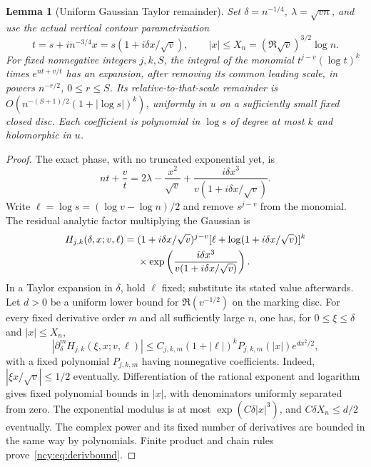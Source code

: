 \documentclass[11pt,letterpaper]{article}
\numberwithin{equation}{section}
\newtheorem{lemma}[theorem]{Lemma}
\theoremstyle{remark}\newtheorem{remark}[theorem]{Remark}
\theoremstyle{definition}\newtheorem{definition}[theorem]{Definition}\theoremstyle{plain}
\begin{document}
\begin{lemma}[Uniform Gaussian Taylor remainder]\label{ncy:lem:gaussian}
Set $\delta=n^{-1/4}$, $\lambda=\sqrt{vn}$, and use the actual
vertical contour parametrization
\[
 t=s+in^{-3/4}x=s(1+i\delta x/\sqrt v),\qquad
 |x|\leq X_n=(\Re\sqrt v)^{3/2}\log n.
\]
For fixed nonnegative integers $j,k,S$, the integral of the monomial
$t^{j-v}(\log t)^k$ times $e^{nt+v/t}$ has an expansion, after removing
its common leading scale, in powers $n^{-r/2}$, $0\leq r\leq S$.
Its relative-to-that-scale remainder is
$O(n^{-(S+1)/2}(1+|\log s|)^k)$, uniformly in $u$ on a sufficiently
small fixed closed disc. Each coefficient is polynomial in $\log s$
of degree at most $k$ and holomorphic in $u$.
\end{lemma}
\begin{proof}
The exact phase, with no truncated exponential yet, is
\begin{equation}\label{ncy:eq:exactphase}
 nt+\frac vt=2\lambda-\frac{x^2}{\sqrt v}
             +\frac{i\delta x^3}{v(1+i\delta x/\sqrt v)}.
\end{equation}
Write $\ell=\log s=(\log v-\log n)/2$ and remove $s^{j-v}$ from the
monomial. The residual analytic factor multiplying the Gaussian is
\begin{align}\label{ncy:eq:H}
 H_{j,k}(\delta,x;v,\ell)={}&(1+i\delta x/\sqrt v)^{j-v}
       [\ell+\log(1+i\delta x/\sqrt v)]^k\notag\\
 &\times\exp\left(\frac{i\delta x^3}{v(1+i\delta x/\sqrt v)}\right).
\end{align}
In a Taylor expansion in $\delta$, hold $\ell$ fixed; substitute its
stated value afterwards. Let $d>0$ be a uniform lower bound for
$\Re(v^{-1/2})$ on the marking disc. For every fixed derivative order
$m$ and all sufficiently large $n$, one has, for $0\leq\xi\leq\delta$
and $|x|\leq X_n$,
\begin{equation}\label{ncy:eq:derivbound}
 |\partial_\delta^mH_{j,k}(\xi,x;v,\ell)|
 \leq C_{j,k,m}(1+|\ell|)^k
            P_{j,k,m}(|x|)e^{dx^2/2},
\end{equation}
with a fixed polynomial $P_{j,k,m}$ having nonnegative coefficients.
Indeed, $|\xi x/\sqrt v|\leq1/2$ eventually. Differentiation of the
rational exponent and logarithm gives fixed polynomial bounds in
$|x|$, with denominators uniformly separated from zero. The exponential
modulus is at most $\exp(C\delta |x|^3)$, and
$C\delta X_n\leq d/2$ eventually. The complex power and its fixed
number of derivatives are bounded in the same way by polynomials.
Finite product and chain rules prove~\eqref{ncy:eq:derivbound}.


\end{proof}
\end{document}
